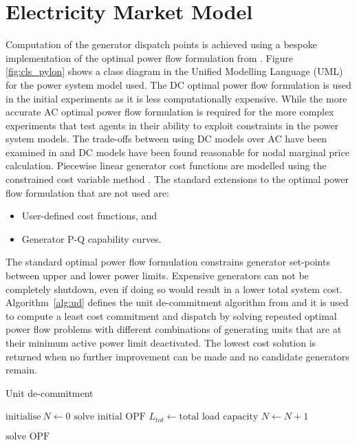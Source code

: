 \section{Electricity Market Model}
Computation of the generator dispatch points is achieved using a bespoke
implementation of the optimal power flow formulation from
\matpower \cite[\S5]{pserc:mp_manual}.  Figure \ref{fig:cls_pylon} shows a
class diagram in the Unified Modelling Language (UML) for the power system
model used.  The DC optimal power flow formulation is used in the initial experiments
as it is less computationally expensive.  While the more accurate AC optimal
power flow formulation is required for the more complex experiments that test
agents in their ability to exploit constraints in the power system models.
The trade-offs between using DC models over AC have been examined in
 and DC models have been found reasonable for nodal
marginal price calculation.  Piecewise linear generator cost functions are
modelled using the constrained cost variable method \cite{zimmerman:ccv}.  The
standard extensions to the \matpower optimal power flow formulation that are
not used are:
\begin{itemize}
  \item User-defined cost functions, and
  \item Generator P-Q capability curves.
\end{itemize}



The standard optimal power flow formulation constrains generator set-points
between upper and lower power limits.  Expensive generators can not be
completely shutdown, even if doing so would result in a lower total system
cost.  Algorithm~\ref{alg:ud} defines the unit de-commitment algorithm from
 and it is used to compute a least cost commitment
and dispatch by solving repeated optimal power flow problems with different
combinations of generating units that are at their minimum active power limit
deactivated.  The lowest cost solution is returned when no further improvement
can be made and no candidate generators remain. \begin{algorithm}[H]
\caption{Unit de-commitment}
\label{alg:ud}
\begin{algorithmic}[1]
\STATE $\text{initialise}~N \leftarrow 0$
\STATE $\text{solve initial OPF}$
\STATE $L_{tot} \leftarrow \text{total load capacity}$
	\STATE $N \leftarrow N + 1$
\ENDWHILE

\REPEAT
		\STATE $\text{solve OPF}$
	\ENDFOR
{}
\end{algorithmic}
\end{algorithm}

